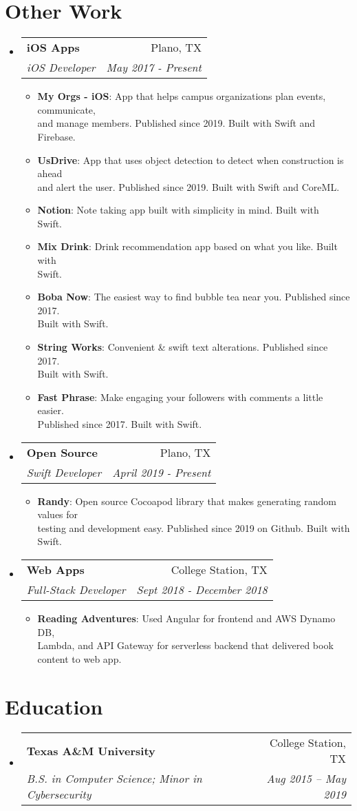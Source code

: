 \documentclass[letterpaper,11pt]{article}
\makeatletter
\newcommand{\resumeItem}[2]{
  \item\small{
    \textbf{#1}{: #2 \vspace{-2pt}}
  }
}
\newcommand{\resumeSubheading}[4]{
  \vspace{-1pt}\item
    \begin{tabular*}{0.97\textwidth}{l@{\extracolsep{\fill}}r}
      \textbf{#1} & #2 \\
      \textit{\small#3} & \textit{\small #4} \\
    \end{tabular*}\vspace{-5pt}
}
\newcommand{\resumeSubHeadingListStart}{\begin{itemize}[leftmargin=*]}
\newcommand{\resumeSubHeadingListEnd}{\end{itemize}}
\newcommand{\resumeItemListStart}{\begin{itemize}}
\newcommand{\resumeItemListEnd}{\end{itemize}\vspace{-5pt}}
\makeatother
\begin{document}
\section{Other Work}
  \resumeSubHeadingListStart
    \resumeSubheading
      {iOS Apps}{Plano, TX}
      {iOS Developer}{May 2017 - Present}
      \resumeItemListStart
        \resumeItem{My Orgs - iOS}
          {App that helps campus organizations plan events, communicate,
          \\and manage members. Published since 2019. Built with Swift and Firebase.}
        \resumeItem{UsDrive}
          {App that uses object detection to detect when construction is ahead\\and alert the user. Published since 2019. Built with Swift and CoreML.}
        \resumeItem{Notion}
          {Note taking app built with simplicity in mind. Built with\\Swift.}
        \resumeItem{Mix Drink}
          {Drink recommendation app based on what you like. Built with\\Swift.}
        \resumeItem{Boba Now}
          {The easiest way to find bubble tea near you. Published since 2017.\\Built with Swift.}
        \resumeItem{String Works}
          {Convenient \& swift text alterations. Published since 2017.\\Built with Swift.}
        \resumeItem{Fast Phrase}
          {Make engaging your followers with comments a little easier. \\Published since 2017. Built with Swift.}
      \resumeItemListEnd
      
    \resumeSubheading
      {Open Source}{Plano, TX}
      {Swift Developer}{April 2019 - Present}
      \resumeItemListStart
        \resumeItem{Randy}
          {Open source Cocoapod library that makes generating random values for\\ testing and development easy. Published since 2019 on Github. Built with Swift.}
      \resumeItemListEnd

    \resumeSubheading
      {Web Apps}{College Station, TX}
      {Full-Stack Developer}{Sept 2018 - December 2018}
      \resumeItemListStart
        \resumeItem{Reading Adventures}
          {Used Angular for frontend and AWS Dynamo DB,\\ Lambda, and API Gateway for serverless backend that delivered book\\content to web app.}
      \resumeItemListEnd

  \resumeSubHeadingListEnd
  

\section{Education}
  \resumeSubHeadingListStart
    \resumeSubheading
      {Texas A\&M University}{College Station, TX}
      {B.S. in Computer Science; Minor in Cybersecurity}{Aug 2015 -- May 2019}
  \resumeSubHeadingListEnd
\end{document}
